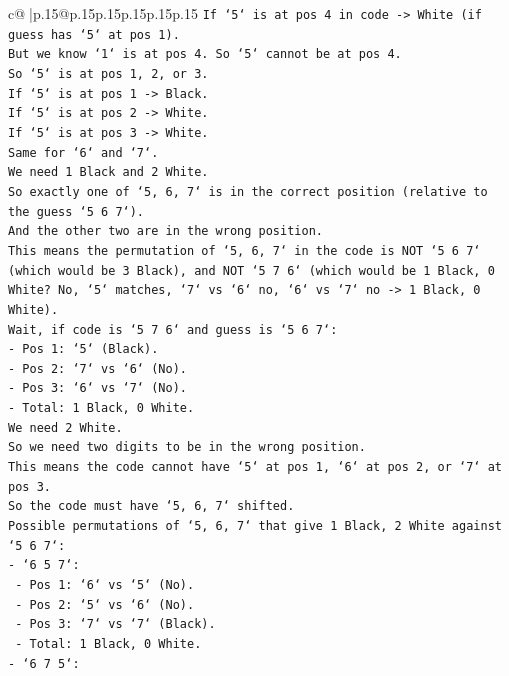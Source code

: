 \documentclass{article}
\begin{document}
{\begin{supertabular}{c@{$\;$}|p{.15\linewidth}@{}p{.15\linewidth}p{.15\linewidth}p{.15\linewidth}p{.15\linewidth}p{.15\linewidth}}
{{{\texttt{If `5` is at pos 4 in code {-}> White (if guess has `5` at pos 1).} \\
\texttt{But we know `1` is at pos 4. So `5` cannot be at pos 4.} \\
\texttt{So `5` is at pos 1, 2, or 3.} \\
\texttt{If `5` is at pos 1 {-}> Black.} \\
\texttt{If `5` is at pos 2 {-}> White.} \\
\texttt{If `5` is at pos 3 {-}> White.} \\
\texttt{Same for `6` and `7`.} \\
\texttt{We need 1 Black and 2 White.} \\
\texttt{So exactly one of `5, 6, 7` is in the correct position (relative to the guess `5 6 7`).} \\
\texttt{And the other two are in the wrong position.} \\
\texttt{This means the permutation of `5, 6, 7` in the code is NOT `5 6 7` (which would be 3 Black), and NOT `5 7 6` (which would be 1 Black, 0 White? No, `5` matches, `7` vs `6` no, `6` vs `7` no {-}> 1 Black, 0 White).} \\
\texttt{Wait, if code is `5 7 6` and guess is `5 6 7`:} \\
\texttt{{-} Pos 1: `5` (Black).} \\
\texttt{{-} Pos 2: `7` vs `6` (No).} \\
\texttt{{-} Pos 3: `6` vs `7` (No).} \\
\texttt{{-} Total: 1 Black, 0 White.} \\
\texttt{We need 2 White.} \\
\texttt{So we need two digits to be in the wrong position.} \\
\texttt{This means the code cannot have `5` at pos 1, `6` at pos 2, or `7` at pos 3.} \\
\texttt{So the code must have `5, 6, 7` shifted.} \\
\texttt{Possible permutations of `5, 6, 7` that give 1 Black, 2 White against `5 6 7`:} \\
\texttt{{-} `6 5 7`:} \\
\texttt{  {-} Pos 1: `6` vs `5` (No).} \\
\texttt{  {-} Pos 2: `5` vs `6` (No).} \\
\texttt{  {-} Pos 3: `7` vs `7` (Black).} \\
\texttt{  {-} Total: 1 Black, 0 White.} \\
\texttt{{-} `6 7 5`:} \\
}}}
\end{supertabular}}
\end{document}
